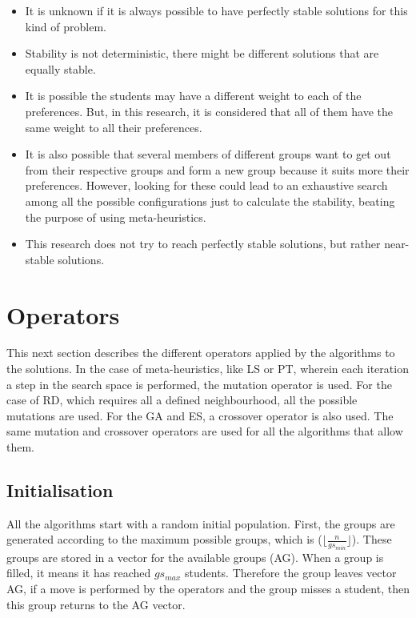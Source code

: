 \begin{itemize}
    \item It is unknown if it is always possible to have perfectly stable solutions for this kind of problem.
    \item Stability is not deterministic, there might be different solutions that are equally stable.
    \item It is possible the students may have a different weight to each of the preferences. But, in this research, it is considered that all of them have the same weight to all their preferences.
    \item It is also possible that several members of different groups want to get out from their respective groups and form a new group because it suits more their preferences. However, looking for these could lead to an exhaustive search among all the possible configurations just to calculate the stability, beating the purpose of using meta-heuristics. 
    \item This research does not try to reach perfectly stable solutions, but rather near-stable solutions. 
\end{itemize}

\section{Operators} 
\label{sec:operators}

This next section describes the different operators applied by the algorithms to the solutions. In the case of meta-heuristics, like LS or PT, wherein each iteration a step in the search space is performed, the mutation operator is used. For the case of RD, which requires all a defined neighbourhood, all the possible mutations are used. For the GA and ES, a crossover operator is also used. The same mutation and crossover operators are used for all the algorithms that allow them.\

\subsection{Initialisation}
\label{sec:initialisation}

All the algorithms start with a random initial population. First, the groups are generated according to the maximum possible groups, which is ($\lfloor\frac{n}{gs_{min}}\rfloor$). These groups are stored in a vector for the available groups (AG). When a group is filled, it means it has reached $gs_{max}$ students. Therefore the group leaves vector AG, if a move is performed by the operators and the group misses a student, then this group returns to the AG vector.\


